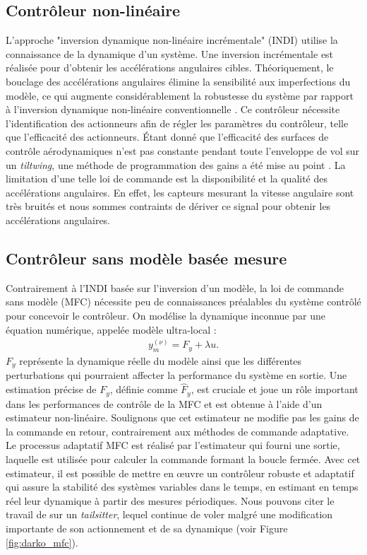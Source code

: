 \subsection*{Contrôleur non-linéaire}

L'approche "inversion dynamique non-linéaire incrémentale" (INDI) utilise la connaissance de la dynamique d'un système. Une inversion incrémentale est réalisée pour d'obtenir les accélérations angulaires cibles. Théoriquement, le bouclage des accélérations angulaires élimine la sensibilité aux imperfections du modèle, ce qui augmente considérablement la robustesse du système par rapport à l'inversion dynamique non-linéaire conventionnelle \cite{Sieberling2010, Binz2019}. Ce contrôleur nécessite l'identification des actionneurs afin de régler les paramètres du contrôleur, telle que l'efficacité des actionneurs. Étant donné que l'efficacité des surfaces de contrôle aérodynamiques n'est pas constante pendant toute l'enveloppe de vol sur un \textit{tiltwing}, une méthode de programmation des gains a été mise au point \cite{smeurINDI,smeurINDITail}.
La limitation d'une telle loi de commande est la disponibilité et la qualité  des accélérations angulaires. En effet, les capteurs mesurant la vitesse angulaire sont très bruités et nous sommes contraints de dériver ce signal pour obtenir les accélérations angulaires.



\subsection*{Contrôleur sans modèle basée mesure}

Contrairement à l'INDI basée sur l'inversion d'un modèle, la loi de commande sans modèle (MFC) \cite{Fliess_2013}  nécessite peu de connaissances préalables du système contrôlé pour concevoir le contrôleur.
On modélise la dynamique inconnue par une équation numérique, appelée modèle ultra-local :
\begin{align}
    y_{m}^{(\nu)} = F_{y} + \lambda u.
\end{align}
$F_{y}$ représente la dynamique réelle du modèle ainsi que les différentes perturbations qui pourraient affecter la performance du système en sortie. Une estimation précise de $F_{y}$, définie comme $\hat{F}_{y}$, est cruciale et joue un rôle important dans les performances de contrôle de la MFC et est obtenue à l'aide d'un estimateur non-linéaire. Soulignons que cet estimateur ne modifie pas les gains de la commande en retour, contrairement aux méthodes de commande adaptative. Le processus adaptatif MFC est réalisé par l'estimateur qui fourni une sortie, laquelle est utilisée pour calculer la commande formant la boucle fermée. Avec cet estimateur, il est possible de mettre en œuvre un contrôleur robuste et adaptatif qui assure la stabilité des systèmes variables dans le temps, en estimant en temps réel leur dynamique à partir des mesures périodiques. Nous pouvons citer le travail de \cite{olszaneckibarthHal-02542982} sur un \textit{tailsitter}, lequel continue de voler malgré une modification importante de son actionnement et de sa dynamique (voir Figure \ref{fig:darko_mfc}).

